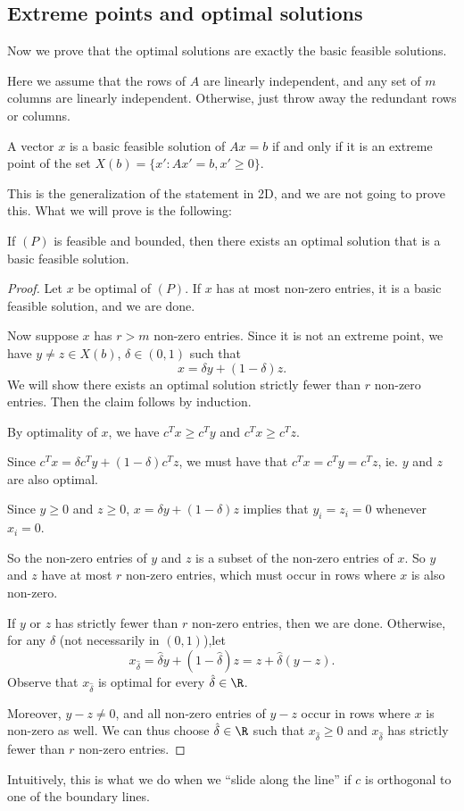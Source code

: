 \documentclass[a4paper]{article}
\begin{document}
\subsection{Extreme points and optimal solutions}
Now we prove that the optimal solutions are exactly the basic feasible solutions.

Here we assume that the rows of $A$ are linearly independent, and any set of $m$ columns are linearly independent. Otherwise, just throw away the redundant rows or columns.

\begin{thm}[]
  A vector $x$ is a basic feasible solution of $Ax = b$ if and only if it is an extreme point of the set $X(b) = \{x': Ax' = b, x' \geq 0\}$.
\end{thm}
This is the generalization of the statement in 2D, and we are not going to prove this. What we will prove is the following:

\begin{thm}[]
  If $(P)$ is feasible and bounded, then there exists an optimal solution that is a basic feasible solution.
\end{thm}

\begin{proof}
  Let $x$ be optimal of $(P)$. If $x$ has at most non-zero entries, it is a basic feasible solution, and we are done.

  Now suppose $x$ has $r > m$ non-zero entries. Since it is not an extreme point, we have $y\not= z\in X(b)$, $\delta \in (0, 1)$ such that
  \[
    x = \delta y + (1 - \delta) z.
  \]
  We will show there exists an optimal solution strictly fewer than $r$ non-zero entries. Then the claim follows by induction.

  By optimality of $x$, we have $c^T x \geq c^T y$ and $c^T x \geq c^T z$.

  Since $c^T x = \delta c^T y + (1 - \delta)c^Tz$, we must have that $c^T x = c^T y = c^T z$, ie. $y$ and $z$ are also optimal.

  Since $y \geq 0$ and $z \geq 0$, $x = \delta y + (1 - \delta) z$ implies that $y_i = z_i = 0$ whenever $x_i = 0$.

  So the non-zero entries of $y$ and $z$ is a subset of the non-zero entries of $x$. So $y$ and $z$ have at most $r$ non-zero entries, which must occur in rows where $x$ is also non-zero.

  If $y$ or $z$ has strictly fewer than $r$ non-zero entries, then we are done. Otherwise, for any $\hat{\delta}$ (not necessarily in $(0, 1)$),let
  \[
    x_{\hat{\delta}} = \hat{\delta} y + (1 - \hat{\delta}) z = z + \hat{\delta}(y - z).
  \]
  Observe that $x_{\hat{\delta}}$ is optimal for every $\hat\delta\in \R$.

  Moreover, $y - z \not= 0$, and all non-zero entries of $y - z$ occur in rows where $x$ is non-zero as well. We can thus choose $\hat\delta\in \R$ such that $x_{\hat{\delta}} \geq 0$ and $x_{\hat{\delta}}$ has strictly fewer than $r$ non-zero entries.
\end{proof}
Intuitively, this is what we do when we ``slide along the line'' if $c$ is orthogonal to one of the boundary lines.
\end{document}
